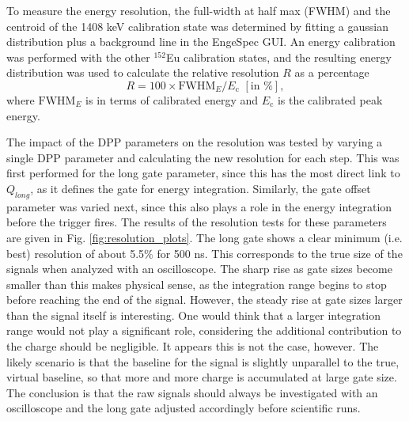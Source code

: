 To measure the energy resolution, the full-width at half max (FWHM) and the centroid of the 1408 keV calibration state was determined by fitting a gaussian distribution plus a background line in the EngeSpec GUI. An energy calibration was performed with the other $^{152}$Eu calibration states, and the resulting energy distribution was used to calculate the relative resolution $R$ as a percentage
\begin{equation}
R = 100 \times \mathrm{FWHM}_{E}/E_{\mathrm{c}} \,\, [\mathrm{in} \, \, \%],
\end{equation}
where $\mathrm{FWHM}_{E}$ is in terms of calibrated energy and $E_{\mathrm{c}}$ is the calibrated peak energy.

The impact of the DPP parameters on the resolution was tested by varying a single DPP parameter and calculating the new resolution for each step. This was first performed for the long gate parameter, since this has the most direct link to $Q_{long}$, as it defines the gate for energy integration. Similarly, the gate offset parameter was varied next, since this also plays a role in the energy integration before the trigger fires. The results of the resolution tests for these parameters are given in Fig. \ref{fig:resolution_plots}. The long gate shows a clear minimum (i.e. best) resolution of about 5.5$\%$ for 500 ns. This corresponds to the true size of the signals when analyzed with an oscilloscope. The sharp rise as gate sizes become smaller than this makes physical sense, as the integration range begins to stop before reaching the end of the signal. However, the steady rise at gate sizes larger than the signal itself is interesting. One would think that a larger integration range would not play a significant role, considering the additional contribution to the charge should be negligible. It appears this is not the case, however. The likely scenario is that the baseline for the signal is slightly unparallel to the true, virtual baseline, so that more and more charge is accumulated at large gate size. The conclusion is that the raw signals should always be investigated with an oscilloscope and the long gate adjusted accordingly before scientific runs.

